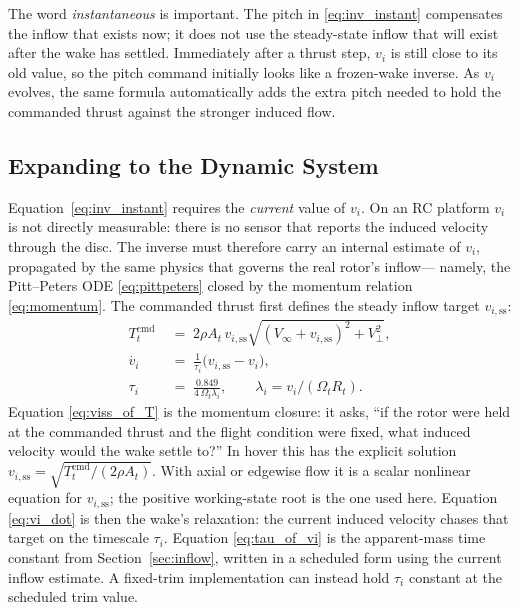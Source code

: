 \documentclass[11pt,a4paper]{article}
\newcommand{\OmegaT}{\Omega_t}
\newcommand{\Rt}{R_t}
\newcommand{\At}{A_t}
\newcommand{\vi}{v_i}
\newcommand{\viss}{v_{i,\text{ss}}}
\newcommand{\Tcmd}{T_t^{\text{cmd}}}
\begin{document}
The word \emph{instantaneous} is important. The pitch in
\eqref{eq:inv_instant} compensates the inflow that exists now; it does
not use the steady-state inflow that will exist after the wake has
settled. Immediately after a thrust step, \(\vi\) is still close to its
old value, so the pitch command initially looks like a frozen-wake
inverse. As \(\vi\) evolves, the same formula automatically adds the
extra pitch needed to hold the commanded thrust against the stronger
induced flow.

\subsection{Expanding to the Dynamic System}\label{ssec:dynamic_inverse}

Equation~\eqref{eq:inv_instant} requires the \emph{current} value of
\(\vi\). On an RC platform \(\vi\) is not directly measurable: there
is no sensor that reports the induced velocity through the disc. The
inverse must therefore carry an internal estimate of \(\vi\),
propagated by the same physics that governs the real rotor's inflow---
namely, the Pitt--Peters ODE \eqref{eq:pittpeters} closed by the
momentum relation \eqref{eq:momentum}. The commanded thrust first
defines the steady inflow target \(\viss\):
\begin{align}
\Tcmd \;&=\; 2\rho\At\,\viss
\sqrt{(V_\infty+\viss)^2 + V_\perp^2},
\label{eq:viss_of_T}\\
\dot{\vi} \;&=\; \frac{1}{\tau_i}\bigl(\viss - \vi\bigr),
\label{eq:vi_dot}\\
\tau_i \;&=\; \frac{0.849}{4\,\OmegaT\lambda_i}, \qquad \lambda_i = \vi/(\OmegaT\Rt).
\label{eq:tau_of_vi}
\end{align}
Equation \eqref{eq:viss_of_T} is the momentum closure: it asks, ``if
the rotor were held at the commanded thrust and the flight condition
were fixed, what induced velocity would the wake settle to?'' In hover
this has the explicit solution \(\viss=\sqrt{\Tcmd/(2\rho\At)}\). With
axial or edgewise flow it is a scalar nonlinear equation for \(\viss\);
the positive working-state root is the one used here. Equation
\eqref{eq:vi_dot} is then the wake's relaxation: the current induced
velocity chases that target on the timescale \(\tau_i\). Equation
\eqref{eq:tau_of_vi} is the apparent-mass time constant from
Section~\ref{sec:inflow}, written in a scheduled form using the current
inflow estimate. A fixed-trim implementation can instead hold
\(\tau_i\) constant at the scheduled trim value.
\end{document}

